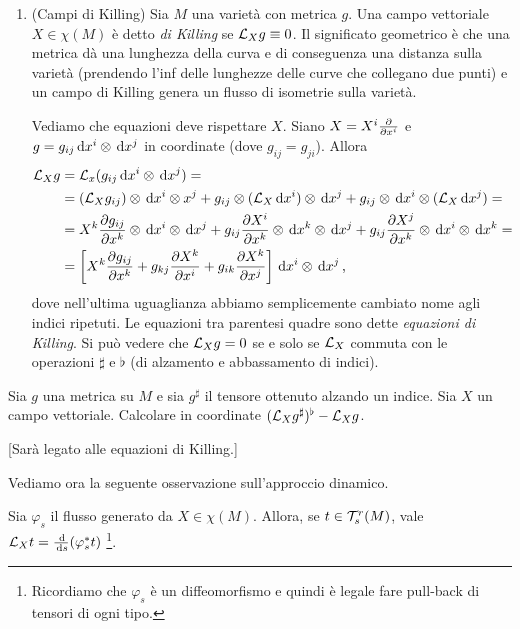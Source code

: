 \begin{example}
\begin{enumerate}

		
		\item (Campi di Killing) Sia $M$ una varietà con metrica $g$. Una campo vettoriale $X\in\chi(M)$ è detto \emph{di Killing} se $\mathcal L_Xg \equiv 0$. Il significato geometrico è che una metrica dà una lunghezza della curva e di conseguenza una distanza sulla varietà (prendendo l'inf delle lunghezze delle curve che collegano due punti) e un campo di Killing genera un flusso di isometrie sulla varietà. %
		
		Vediamo che equazioni deve rispettare $X$. Siano $X = X^i\frac{\partial }{\partial x^i}$ e $g = g_{ij}\,\mathrm d x^i \otimes \,\mathrm d x^j$ in coordinate (dove $g_{ij} = g_{ji}$).
		Allora
		\begin{align*}
		\mathcal L_Xg &= \mathcal L_x (g_{ij}\,\mathrm d x^i \otimes \,\mathrm d x^j) =\\
		&=(\mathcal L_Xg_{ij})\otimes \,\mathrm d x^i\otimes x^j + g_{ij} \otimes (\mathcal L_X\,\mathrm d x^i) \otimes \,\mathrm d x^j + g_{ij}\otimes \,\mathrm d x^i \otimes (\mathcal L_X\,\mathrm d x^j) =\\
		&= X^k \frac{\partial g_{ij}}{\partial x^k}\otimes \,\mathrm d x^i \otimes \,\mathrm d x^j + g_{ij}\frac{\partial X^i}{\partial x^k} \otimes \,\mathrm d x^k \otimes \,\mathrm d x^j + g_{ij} \frac{\partial X^j}{\partial x^k} \otimes \,\mathrm d x^i \otimes \,\mathrm d x^k =\\
		&= \left[X^k \frac{\partial g_{ij}}{\partial x^k} + g_{kj} \frac{\partial X^k}{\partial x^i} + g_{ik} \frac{\partial X^k}{\partial x^j} \right] \,\mathrm d x^i \otimes \,\mathrm d x^j \, \text{, }
		\end{align*}
		dove nell'ultima uguaglianza abbiamo semplicemente cambiato nome agli indici ripetuti. Le equazioni tra parentesi quadre sono dette \emph{equazioni di Killing}. Si può vedere che $\mathcal L_Xg=0$ se e solo se $\mathcal L_X$ commuta con le operazioni $\sharp$ e $\flat$ (di alzamento e abbassamento di indici).
	\end{enumerate}
\end{example}

\begin{exercise}
	Sia $g$ una metrica su $M$ e sia $g^{\sharp}$ il tensore ottenuto alzando un indice. Sia $X$ un campo vettoriale. Calcolare in coordinate $(\mathcal L_X g^\sharp)^\flat - \mathcal L_X g$.
	
	[Sarà legato alle equazioni di Killing.]
\end{exercise}

Vediamo ora la seguente osservazione sull'approccio dinamico.
\begin{remark}
	Sia $\varphi_s$ il flusso generato da $X\in\chi(M)$. Allora, se $t\in\mathcal T_s^r(M)$, vale $\mathcal L_Xt = \frac{\,\mathrm d}{\,\mathrm d s} (\varphi_s^* t)$ \footnote{Ricordiamo che $\varphi_s$ è un diffeomorfismo e quindi è legale fare pull-back di tensori di ogni tipo.}.
\end{remark}